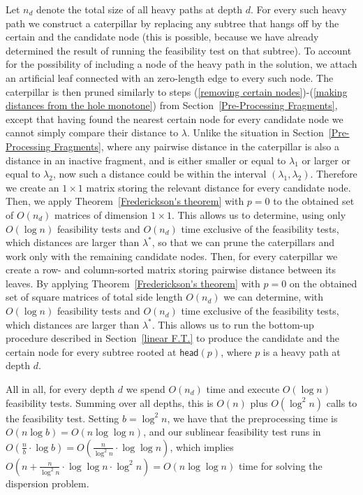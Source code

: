 \documentclass[11pt,a4paper]{article}
\newcommand{\head}{\textsf{head}}
\theoremstyle{definition}
\theoremstyle{remark}
\begin{document}
Let $n_{d}$ denote the total size of all heavy paths at depth $d$. For every such heavy path we construct a caterpillar by replacing
any subtree that hangs off by the certain and the candidate node (this is possible, because we have already determined the result of
running the feasibility test on that subtree). To account for the possibility of including a node of the heavy path in the solution,
we attach an artificial leaf connected with an zero-length edge to every such node.
The caterpillar is then pruned similarly to steps (\ref{removing certain nodes})-(\ref{making distances from the hole monotone})
from Section~\ref{Pre-Processing Fragments}, except that having found the nearest certain node for every candidate
node we cannot simply compare their distance to $\lambda$. Unlike the situation in Section~\ref{Pre-Processing Fragments}, where any pairwise distance in the caterpillar is also a distance in an inactive fragment, and is either smaller or equal to $\lambda_1$ or larger or equal to $\lambda_2$, now such a distance could be within the interval $(\lambda_1,\lambda_2)$. Therefore we create an $1\times 1$ matrix storing the relevant
distance for every candidate node. Then, we apply Theorem~\ref{Frederickson's theorem} with $p=0$ to the obtained set of
$O(n_{d})$ matrices of dimension $1\times 1$. This allows us to determine, using only $O(\log n)$ feasibility tests and
$O(n_{d})$ time exclusive of the feasibility tests, which distances are larger than $\lambda^{*}$, so that we can prune
the caterpillars and work only with the remaining candidate nodes. Then, for every caterpillar we create a row- and column-sorted matrix
storing pairwise distance between its leaves. By applying Theorem~\ref{Frederickson's theorem} with $p=0$ on the obtained set of
square matrices of total side length $O(n_{d})$ we can determine, with $O(\log n)$ feasibility tests and $O(n_{d})$ time
exclusive of the feasibility tests, which distances are larger than $\lambda^{*}$. This allows us to run the bottom-up
procedure described in Section~\ref{linear F.T.} to produce the candidate and the certain node for every subtree rooted
at $\head(p)$, where $p$ is a heavy path at depth $d$.

All in all, for every depth $d$ we spend $O(n_{d})$ time and execute $O(\log n)$ feasibility tests. Summing over all depths,
this is $O(n)$ plus $O(\log^{2}n)$ calls to the feasibility test. Setting $b=\log^{2}n$, we have that the preprocessing time is $O(n \log b) = O(n \log 
\log n)$, and our sublinear feasibility test runs in $O(\frac{n}{b} \cdot \log b) = O(\frac{n}{\log ^2 n} \cdot \log \log n)$, which implies $O(n+\frac{n}{\log^{2}n}\cdot\log\log n\cdot \log^{2}n)=O(n\log\log n)$ time for solving the dispersion problem.
\end{document}
